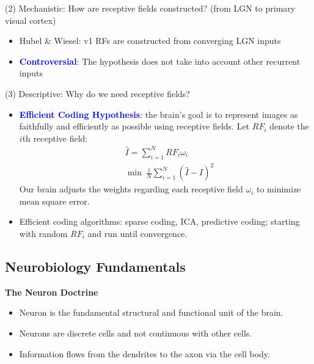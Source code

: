 \documentclass[11pt]{article}
\begin{document}
(2) Mechanistic: How are receptive fields constructed? (from LGN to primary visual cortex)
\begin{itemize}
    \item Hubel \& Wiesel: v1 RFs are constructed from converging LGN inputs
    \begin{center}
        \centering
    \end{center}
    \item \textcolor{Blue}{\textbf{Controversial}}: The hypothesis does not take into account other recurrent inputs
\end{itemize}

(3) Descriptive: Why do we need receptive fields?
\begin{itemize}
    \item \textcolor{Blue}{\textbf{Efficient Coding Hypothesis}}: the brain's goal is to represent images as faithfully and efficiently as possible using receptive fields. Let $RF_i$ denote the $i$th receptive field:
    \begin{align*}
        &\hat{I} = \sum_{i=1}^N RF_i\omega_i\\
        &\min \ \frac{1}{N}\sum_{i=1}^N (\hat{I}-I)^2
    \end{align*}
    Our brain adjusts the weights regarding each receptive field $\omega_i$ to minimize mean square error.
    \item Efficient coding algorithms: sparse coding, ICA, predictive coding; starting with random $RF_i$ and run until convergence.
\end{itemize}

\subsection{Neurobiology Fundamentals}
\noindent \textbf{The Neuron Doctrine}
\begin{itemize}
    \item Neuron is the fundamental structural and functional unit of the brain.
    \item Neurons are discrete cells and not continuous with other cells.
    \item Information flows from the dendrites to the axon via the cell body.
\end{itemize}
\end{document}
